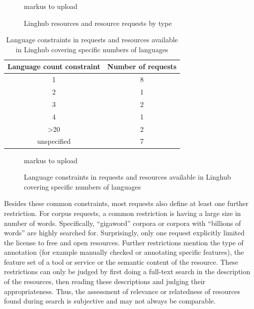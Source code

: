 \documentclass[smallextended]{svjour3}       %
\begin{document}

\begin{figure}
    markus to upload
    \caption{\label{fig:req-by-type}Linghub resources and resource requests by
type}
\end{figure}

\begin{table}
    \begin{tabular}{c|c}
    Language count constraint & Number of requests \\
    \hline
    1                         & 8                  \\
    2                         & 1                  \\
    3                         & 2                  \\
    4                         & 1                  \\
    \textgreater 20                      & 2                  \\
    unspecified               & 7                  \\
\end{tabular}
    \caption{\label{tab:language-constraints}  Language constraints in requests
        and resources available in Linghub covering specific numbers of
    languages}
\end{table}

\begin{figure}
    markus to upload
    \caption{\label{fig:language-constraints} Language constraints in requests
        and resources available in Linghub covering specific numbers of
    languages}
\end{figure}

Besides these common constraints, most requests also define at least one further
restriction. For corpus requests, a common restriction is having a large size in
number of words. Specifically, “gigaword” corpora or corpora with “billions of
words” are highly searched for. Surprisingly, only one request explicitly
limited the license to free and open resources. Further restrictions mention the
type of annotation (for example manually checked or annotating specific
features), the feature set of a tool or service or the semantic content of the
resource. These restrictions can only be judged by first doing a full-text
search in the description of the resources, then reading these descriptions and
judging their appropriateness. Thus, the assessment of relevance or relatedness
of resources found during search is subjective and may not always be comparable.
\end{document}
